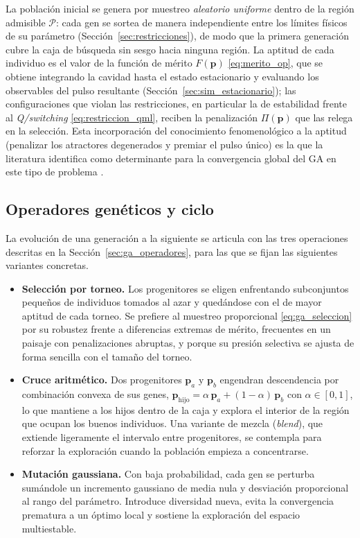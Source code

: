 La población inicial se genera por muestreo \emph{aleatorio uniforme} dentro de la
región admisible $\mathcal{P}$: cada gen se sortea de manera independiente entre los
límites físicos de su parámetro (Sección~\ref{sec:restricciones}), de modo que la
primera generación cubre la caja de búsqueda sin sesgo hacia ninguna región. La
aptitud de cada individuo es el valor de la función de mérito $F(\mathbf{p})$
\eqref{eq:merito_op}, que se obtiene integrando la cavidad hasta el estado
estacionario y evaluando los observables del pulso resultante
(Sección~\ref{sec:sim_estacionario}); las configuraciones que violan las
restricciones, en particular la de estabilidad frente al \emph{Q\-/switching}
\eqref{eq:restriccion_qml}, reciben la penalización $\Pi(\mathbf{p})$ que las relega
en la selección. Esta incorporación del conocimiento fenomenológico a la aptitud
(penalizar los atractores degenerados y premiar el pulso único) es la que la
literatura identifica como determinante para la convergencia global del GA en este
tipo de problema \cite{Woodward2016}.

\subsection{Operadores genéticos y ciclo}
\label{sec:ga_operadores_impl}

La evolución de una generación a la siguiente se articula con las tres operaciones
descritas en la Sección~\ref{sec:ga_operadores}, para las que se fijan las siguientes
variantes concretas.

\begin{itemize}
    \item \textbf{Selección por torneo.} Los progenitores se eligen enfrentando
    subconjuntos pequeños de individuos tomados al azar y quedándose con el de mayor
    aptitud de cada torneo. Se prefiere al muestreo proporcional
    \eqref{eq:ga_seleccion} por su robustez frente a diferencias extremas de mérito, frecuentes en un paisaje con penalizaciones abruptas, y porque su presión
    selectiva se ajusta de forma sencilla con el tamaño del torneo.

    \item \textbf{Cruce aritmético.} Dos progenitores $\mathbf{p}_a$ y
    $\mathbf{p}_b$ engendran descendencia por combinación convexa de sus genes,
    $\mathbf{p}_{\text{hijo}}=\alpha\,\mathbf{p}_a+(1-\alpha)\,\mathbf{p}_b$ con
    $\alpha\in[0,1]$, lo que mantiene a los hijos dentro de la caja y explora el
    interior de la región que ocupan los buenos individuos. Una variante de mezcla
    (\emph{blend}), que extiende ligeramente el intervalo entre progenitores, se
    contempla para reforzar la exploración cuando la población empieza a concentrarse.

    \item \textbf{Mutación gaussiana.} Con baja probabilidad, cada gen se perturba
    sumándole un incremento gaussiano de media nula y desviación proporcional al
    rango del parámetro. Introduce diversidad nueva, evita la convergencia prematura
    a un óptimo local y sostiene la exploración del espacio multiestable.
\end{itemize}

